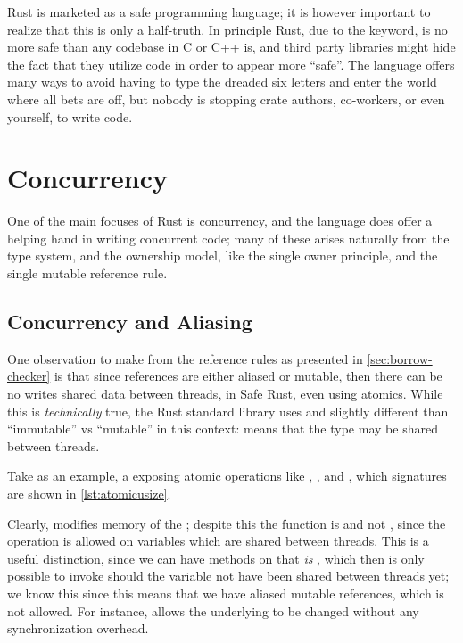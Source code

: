 Rust is marketed as a safe programming language; it is however important to realize that this is
only a half-truth. In principle Rust, due to the  keyword, is no more safe than any
codebase in C or C++ is, and third party libraries might hide the fact that they utilize
 code in order to appear more ``safe''. The language offers many ways to avoid having
to type the dreaded six letters and enter the world where all bets are off, but nobody is stopping
crate authors, co-workers, or even yourself, to write  code.



\section{Concurrency}

One of the main focuses of Rust is concurrency, and the language does offer a helping hand in
writing concurrent code; many of these arises naturally from the type system, and the ownership
model, like the single owner principle, and the single mutable reference rule.


\subsection{Concurrency and Aliasing\label{sec:concurrency-and-aliasing}}

One observation to make from the reference rules as presented in \cref{sec:borrow-checker} is that
since references are either aliased or mutable, then there can be no writes shared data between
threads, in Safe Rust, even using atomics. While this is \emph{technically} true, the Rust standard
library uses  and  slightly different than ``immutable'' vs ``mutable'' in
this context:  means that the type may be shared between threads.

Take  as an example, a  exposing atomic operations like ,
, and , which signatures are shown in \cref{lst:atomicusize}.

Clearly,  modifies memory of the ; despite this the function
is  and not , since the operation is allowed on variables which are
shared between threads.
This is a useful distinction, since we can have methods on  that \emph{is}
, which then is only possible to invoke should the variable not have been shared
between threads yet; we know this since this means that we have aliased mutable references, which
is not allowed. For instance,  allows the
underlying  to be changed without any synchronization overhead.


